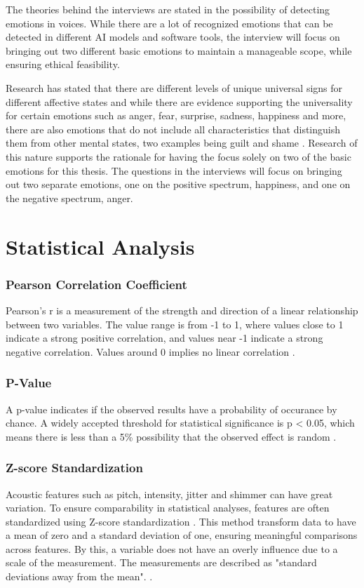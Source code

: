  The theories behind the interviews are stated in the possibility of detecting emotions in voices. While there are a lot of recognized emotions that can be detected in different AI models and software tools, the interview will focus on bringing out two different basic emotions to maintain a manageable scope, while ensuring ethical feasibility.

Research has stated that there are different levels of unique universal signs for different affective states and while there are evidence supporting the universality for certain emotions such as anger, fear, surprise, sadness, happiness and more, there are also emotions that do not include all characteristics that distinguish them from other mental states, two examples being guilt and shame \autocite{Ekman2011}. Research of this nature supports the rationale for having the focus solely on two of the basic emotions for this thesis. The questions in the interviews will focus on bringing out two separate emotions, one on the positive spectrum, happiness, and one on the negative spectrum, anger.


\section{Statistical Analysis}
\label{sec:theo-stat-analyse}

\subsubsection{Pearson Correlation Coefficient}
Pearson's r is a measurement of the strength and direction of a linear relationship between two variables. The value range is from -1 to 1, where values close to 1 
indicate a strong positive correlation, and values near -1 indicate a strong negative correlation. Values around 0 implies no linear correlation \autocite{Bruce2017}.

\subsubsection{P-Value}
A p-value indicates if the observed results have a probability of occurance by chance. A widely accepted threshold for statistical significance 
is p < 0.05, which means there is less than a 5\% possibility that the observed effect is random \autocite{Bruce2017}. 

\subsubsection{Z-score Standardization}
Acoustic features such as pitch, intensity, jitter and shimmer can have great variation. To ensure comparability in statistical analyses, features are often standardized using Z-score standardization \autocite{Ekberg2023}.
This method transform data to have a mean of zero and a standard deviation of one, ensuring meaningful comparisons across features. By this, a variable does not have an overly influence due to a scale of the measurement. 
The measurements are described as "standard deviations away from the mean". \autocite{Bruce2017}. 

